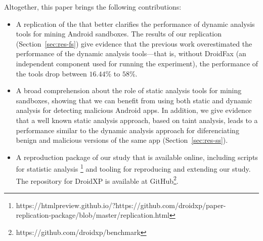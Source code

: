 Altogether, this paper brings the following contributions:

\begin{itemize}
\item A replication of the \blls that better clarifies the performance of
  dynamic analysis tools for mining Android sandboxes. The results of
  our replication (Section~\ref{sec:res-fs})
  give evidence that the previous work overestimated
  the performance of the dynamic analysis tools---that is, without
  DroidFax (an independent component used for running the
  \blls experiment), the performance of the tools drop between $16.44$\% to $58$\%. 

\item A broad comprehension about the role of static analysis tools for mining
  sandboxes, showing that we can benefit from using both static and dynamic
  analysis for detecting malicious Android apps. In addition,
  we give evidence that a well known static analysis approach, based on
  taint analysis, leads to a performance similar to the dynamic analysis
  approach for diferenciating benign and malicious versions of the same
  app (Section~\ref{sec:res-ss}).

\item A reproduction package of our study that is available online, including
  scripts for statistic analysis \footnote{https://htmlpreview.github.io/?https://github.com/droidxp/paper-replication-package/blob/master/replication.html}
  and tooling for reproducing and extending our study. The repository for DroidXP is available
at GitHub\footnote{https://github.com/droidxp/benchmark}.
 
\end{itemize}
